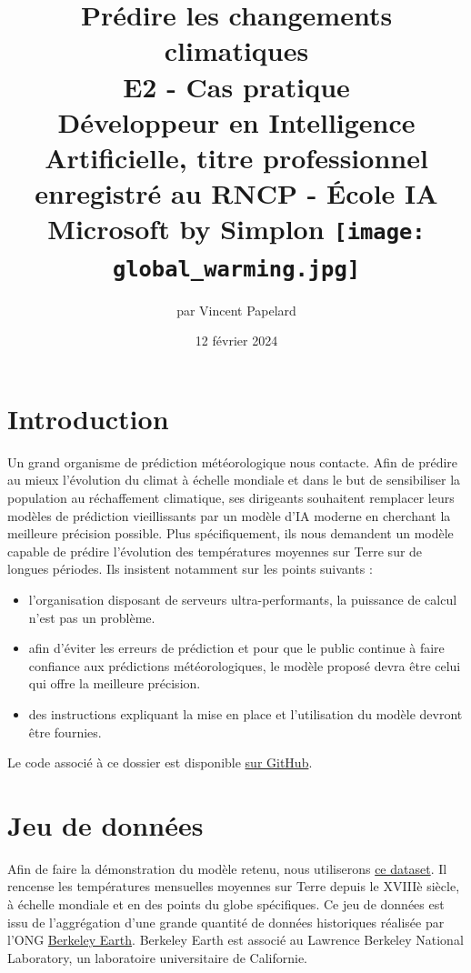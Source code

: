 \documentclass[french]{article}
\title{%
    \huge Prédire les changements climatiques  \\
    \bigskip
    \large E2 - Cas pratique \\ 
    Développeur en Intelligence Artificielle,
    titre professionnel enregistré au RNCP - École IA Microsoft by Simplon
    \vfill
    \texttt{[image: global\_warming.jpg]}
    \vfill}
\date{12 février 2024}
\author{par Vincent Papelard}
\begin{document}
    \renewcommand{\contentsname}{Table des Matières}
    \renewcommand{\refname}{Références}
    \maketitle
    \newpage
    \tableofcontents
    \newpage

    \section*{Introduction}

    Un grand organisme de prédiction météorologique nous contacte. 
    Afin de prédire au mieux l'évolution du climat à échelle mondiale et dans le but de sensibiliser la population au réchaffement climatique, ses dirigeants souhaitent remplacer leurs modèles de prédiction vieillissants par un modèle d'IA moderne en cherchant la meilleure précision possible. Plus spécifiquement, ils nous demandent un modèle capable de prédire l'évolution des températures moyennes sur Terre sur de longues périodes. Ils insistent notamment sur les points suivants :
    \begin{itemize}
        \item l'organisation disposant de serveurs ultra-performants, la puissance de calcul n'est pas un problème.
        \item afin d'éviter les erreurs de prédiction et pour que le public continue à faire confiance aux prédictions météorologiques, le modèle proposé devra être celui qui offre la meilleure précision.
        \item des instructions expliquant la mise en place et l'utilisation du modèle devront être fournies.
    \end{itemize}
    
    Le code associé à ce dossier est disponible \href{https://github.com/vinpap/predict_climate_change}{sur GitHub}.

    \section{Jeu de données}
    
    Afin de faire la démonstration du modèle retenu, nous utiliserons \href{https://www.kaggle.com/datasets/berkeleyearth/climate-change-earth-surface-temperature-data}{ce dataset}. Il rencense les températures mensuelles moyennes sur Terre depuis le XVIIIè siècle, à échelle mondiale et en des points du globe spécifiques. Ce jeu de données est issu de l'aggrégation d'une grande quantité de données historiques réalisée par l'ONG \href{http://berkeleyearth.org/about/}{Berkeley Earth}. Berkeley Earth est associé au Lawrence Berkeley National Laboratory, un laboratoire universitaire de Californie.
\end{document}
